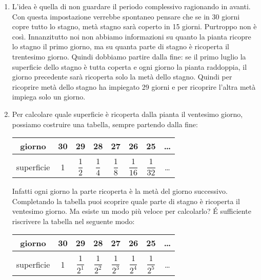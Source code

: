 \begin{enumerate}
 \item
L'idea è quella di non guardare il periodo complessivo 
ragionando in avanti. Con questa impostazione verrebbe spontaneo pensare che se 
in 30 giorni copre tutto lo stagno, metà stagno sarà coperto in 15 giorni. Purtroppo non 
è così.
Innanzitutto noi non abbiamo informazioni su quanto la pianta ricopre lo stagno il primo 
giorno, ma su quanta parte di stagno è ricoperta il trentesimo giorno.
Quindi dobbiamo partire dalla fine: se il primo luglio la superficie dello 
stagno è tutta coperta e ogni giorno la pianta raddoppia, il giorno precedente 
sarà ricoperta solo la metà dello stagno. Quindi per ricoprire metà dello stagno 
ha impiegato 29 giorni e per ricoprire l'altra metà impiega solo un giorno.

 \item
Per calcolare quale superficie è ricoperta dalla pianta il ventesimo giorno, 
possiamo costruire una tabella, sempre partendo dalla fine:

\begin{center}
\begin{tabular}{c|c|c|c|c|c|c|c}
giorno & 30 & 29 & 28 & 27 & 26 & 25 & \dots \\[6pt]
\hline &&&&&&\\ [-6pt]
superficie & 1 & \(\dfrac{1}{2}\) & 
 \(\dfrac{1}{4}\) & 
 \(\dfrac{1}{8}\) & 
 \(\dfrac{1}{16}\) & 
 \(\dfrac{1}{32}\) & \dots \\
\end{tabular}
\end{center}

Infatti ogni giorno la parte ricoperta è la metà del giorno successivo.
Completando la tabella puoi scoprire quale parte di stagno è ricoperta il 
ventesimo giorno. Ma esiste un modo più veloce per calcolarlo?
\'E sufficiente riscrivere la tabella nel seguente modo:

\begin{center}
\begin{tabular}{c|c|c|c|c|c|c|c}
giorno & 30 & 29 & 28 & 27 & 26 & 25 & \dots \\[6pt]
\hline &&&&&&\\ [-6pt]
superficie & 1 & \(\dfrac{1}{2^1}\) & 
 \(\dfrac{1}{2^2}\) & 
 \(\dfrac{1}{2^3}\) & 
 \(\dfrac{1}{2^4}\) & 
 \(\dfrac{1}{2^5}\) & \dots \\
\end{tabular}
\end{center}


\end{enumerate}
